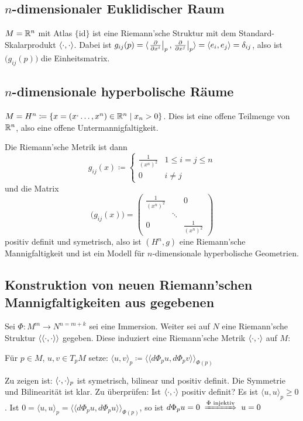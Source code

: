 \documentclass[a4paper,twoside,DIV15,BCOR12mm]{scrbook}
\renewcommand{\da}{\coloneqq}
\begin{document}
\subsection{$n$-dimensionaler Euklidischer Raum}
$M=\mathbb{R}^n$ mit Atlas $\{\text{id}\}$ ist eine Riemann’sche Struktur mit dem Standard-Skalarprodukt $\langle\cdot,\cdot\rangle$. Dabei ist $g_{ij}(p) = \langle \left.\frac{\partial}{\partial x^{i}}\right|_p, \left.\frac{\partial}{\partial x^{j}}\right|_p \rangle = \langle e_i, e_j \rangle = \delta_{ij}$, also ist $\big(g_{ij}(p)\big)$ die Einheitsmatrix.

\subsection{$n$-dimensionale hyperbolische Räume}
$M = H^n \da \{ x = (x^,\ldots, x^n) \in \MdR^n \mid x_n > 0 \}$. Dies ist eine offene Teilmenge von $\mathbb{R}^n$, also eine offene Untermannigfaltigkeit.

Die Riemann’sche Metrik ist dann 
\[
g_{ij}(x) \da 
\begin{cases}
\frac 1 {(x^n)^2} & 1\le i = j \le n \\
0 & i \ne j
\end{cases}
\]
und die Matrix 
\[
\big(g_{ij}(x)\big) = 
\begin{pmatrix}
\frac 1 {(x^n)^2}& & 0 \\
& \ddots & \\
0 & & \frac 1 {(x^n)^2}
\end{pmatrix}
\]
positiv definit und symetrisch, also ist $(H^n, g)$ eine Riemann’sche Mannigfaltigkeit und ist ein Modell für $n$-dimensionale hyperbolische Geometrien.

\subsection{Konstruktion von neuen Riemann’schen Mannigfaltigkeiten aus gegebenen}

Sei $\Phi: M^m \to N^{n=m+k}$ sei eine Immersion. Weiter sei auf $N$ eine Riemann’sche Struktur $\langle\langle\cdot,\cdot\rangle\rangle$ gegeben. Diese induziert eine Riemann’sche Metrik $\langle\cdot,\cdot\rangle$ auf $M$:

Für $p\in M$, $u,v\in T_pM$ setze: $\langle u,v\rangle_p \da \langle\langle d\Phi_pu, d\Phi_p v \rangle\rangle_{\Phi(p)}$

Zu zeigen ist: $\langle\cdot,\cdot\rangle_p$ ist symetrisch, bilinear und positiv definit. Die Symmetrie und Bilinearität ist klar. Zu überprüfen: Ist $\langle\cdot,\cdot\rangle$ positiv definit? Es ist $\langle u,u\rangle_p \ge 0$. Ist $0 = \langle u,u\rangle_p = \langle\langle d\Phi_pu,d\Phi_pu\rangle\rangle_{\Phi(p)}$, so ist $d\Phi_pu = 0 \folgtnach{$\Phi$ injektiv} u = 0$
\end{document}
